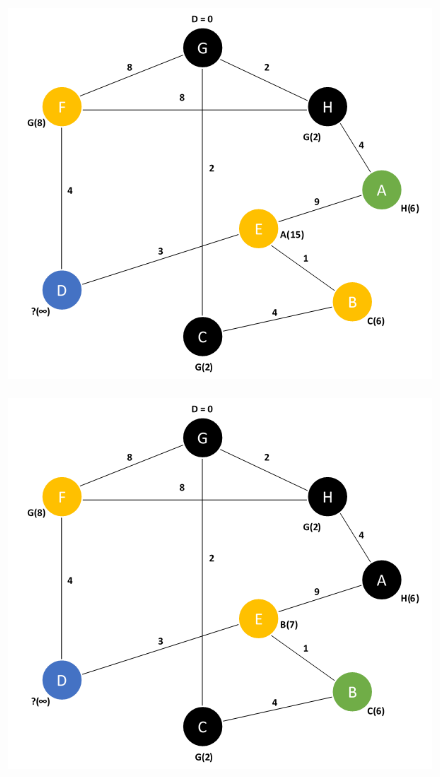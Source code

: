 \documentclass{article}
\begin{document}
\begin{figure}[H]
\centering
\includegraphics[scale=0.6]{images/Q1/04.png}
\end{figure}

\begin{figure}[H]
\centering
\includegraphics[scale=0.6]{images/Q1/05.png}
\end{figure}
\end{document}
